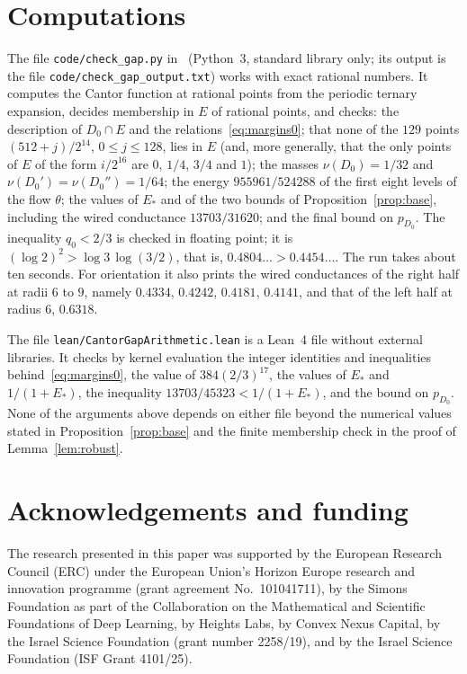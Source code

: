 \documentclass[11pt]{amsart}
\theoremstyle{remark}
\begin{document}
\section{Computations}\label{sec:computations}

The file \texttt{code/check\_gap.py} in~\cite{code} (Python~3, standard library only; its output is the file \texttt{code/check\_gap\_output.txt}) works with exact rational numbers. It computes the Cantor function at rational points from the periodic ternary expansion, decides membership in $E$ of rational points, and checks: the description of $D_0\cap E$ and the relations~\eqref{eq:margins0}; that none of the $129$ points $(512+j)/2^{14}$, $0\le j\le128$, lies in $E$ (and, more generally, that the only points of $E$ of the form $i/2^{16}$ are $0$, $1/4$, $3/4$ and $1$); the masses $\nu(D_0)=1/32$ and $\nu(D_0')=\nu(D_0'')=1/64$; the energy $955961/524288$ of the first eight levels of the flow $\theta$; the values of $E_*$ and of the two bounds of Proposition~\ref{prop:base}, including the wired conductance $13703/31620$; and the final bound on $p_{D_0}$. The inequality $q_0<2/3$ is checked in floating point; it is $(\log2)^2>\log3\,\log(3/2)$, that is, $0.4804\ldots>0.4454\ldots$. The run takes about ten seconds. For orientation it also prints the wired conductances of the right half at radii $6$ to $9$, namely $0.4334$, $0.4242$, $0.4181$, $0.4141$, and that of the left half at radius $6$, $0.6318$.

The file \texttt{lean/CantorGapArithmetic.lean} is a Lean~4 file without external libraries. It checks by kernel evaluation the integer identities and inequalities behind~\eqref{eq:margins0}, the value of $384(2/3)^{17}$, the values of $E_*$ and $1/(1+E_*)$, the inequality $13703/45323<1/(1+E_*)$, and the bound on $p_{D_0}$. None of the arguments above depends on either file beyond the numerical values stated in Proposition~\ref{prop:base} and the finite membership check in the proof of Lemma~\ref{lem:robust}.

\section*{Acknowledgements and funding}
The research presented in this paper was supported by the European Research
Council (ERC) under the European Union's Horizon Europe research and
innovation programme (grant agreement No.~101041711), by the Simons
Foundation as part of the Collaboration on the Mathematical and Scientific
Foundations of Deep Learning, by Heights Labs, by Convex Nexus Capital, by
the Israel Science Foundation (grant number 2258/19), and by the Israel
Science Foundation (ISF Grant 4101/25).
\end{document}
